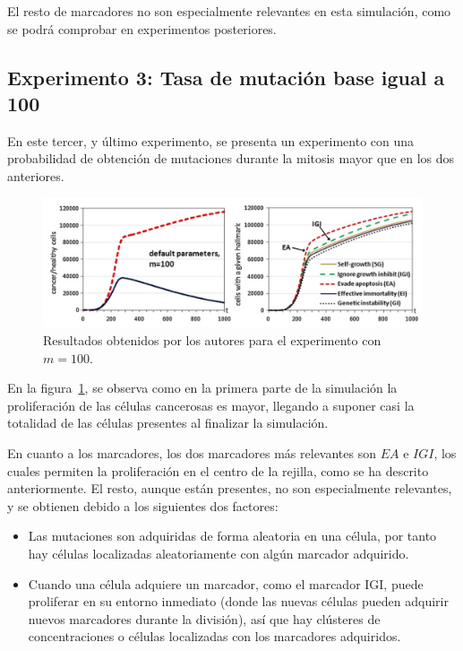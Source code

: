 El resto de marcadores no son especialmente relevantes en esta simulación, como se podrá comprobar
en experimentos posteriores.

\subsection{Experimento 3: Tasa de mutación base igual a 100}

En este tercer, y último experimento, se presenta un experimento con una probabilidad de obtención de
mutaciones durante la mitosis mayor que en los dos anteriores.

\begin{figure}[h]
\centering
\includegraphics[scale=0.6]{figures/experiments/exp3}
\caption{Resultados obtenidos por los autores para el experimento con $m=100$.}
\label{fig:exp3}
\end{figure}

En la figura~\ref{fig:exp3}, se observa como en la primera parte de la simulación la proliferación
de las células cancerosas es mayor, llegando a suponer casi la totalidad de las células presentes
al finalizar la simulación.

En cuanto a los marcadores, los dos marcadores más relevantes son $EA$ e $IGI$, los cuales
permiten la proliferación en el centro de la rejilla, como se ha descrito anteriormente.
El resto, aunque están presentes, no son especialmente relevantes, y se obtienen debido a
los siguientes dos factores:

\begin{itemize}
  \item Las mutaciones son adquiridas de forma aleatoria en una célula, por tanto hay células localizadas aleatoriamente con algún marcador adquirido.
  \item Cuando una célula adquiere un marcador, como el marcador IGI, puede proliferar en su entorno inmediato (donde las nuevas células pueden adquirir nuevos marcadores durante la división), así que hay clústeres de concentraciones o células localizadas con los marcadores adquiridos.
\end{itemize}


